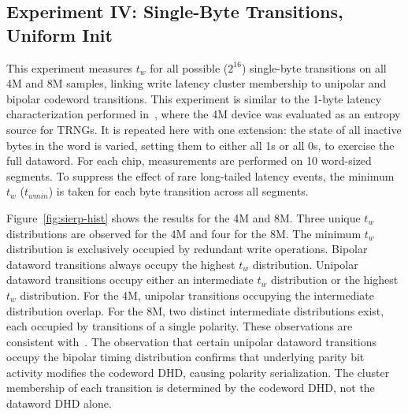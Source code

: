 \subsection{Experiment IV: Single-Byte Transitions, Uniform Init}
\label{sec:brewrc-exp4} This experiment measures $t_w$ for all possible
($2^{16}$) single-byte transitions on all 4M and 8M samples, linking
write latency cluster membership to unipolar and bipolar codeword
transitions. This experiment is similar to the 1-byte latency
characterization performed in~\cite{tolga2024trng}, where the 4M device
was evaluated as an entropy source for TRNGs. It is repeated here with
one extension: the state of all inactive bytes in the word is varied,
setting them to either all 1s or all 0s, to exercise the full dataword.
For each chip, measurements are performed on 10 word-sized segments. To
suppress the effect of rare long-tailed latency events, the minimum
$t_w$ ($t_{wmin}$) is taken for each byte transition across all
segments.

Figure~\ref{fig:sierp-hist} shows the results for the 4M and 8M. Three
unique $t_w$ distributions are observed for the 4M and four for the 8M.
The minimum $t_w$ distribution is exclusively occupied by redundant
write operations. Bipolar dataword transitions always occupy the highest
$t_w$ distribution. Unipolar dataword transitions occupy either an
intermediate $t_w$ distribution or the highest $t_w$ distribution. For
the 4M, unipolar transitions occupying the intermediate distribution
overlap. For the 8M, two distinct intermediate distributions exist, each
occupied by transitions of a single polarity. These observations are
consistent with~\cite{tolga2024trng}. The observation that certain
unipolar dataword transitions occupy the bipolar timing distribution
confirms that underlying parity bit activity modifies the codeword DHD,
causing polarity serialization. The cluster membership of each
transition is determined by the codeword DHD, not the dataword DHD
alone.
